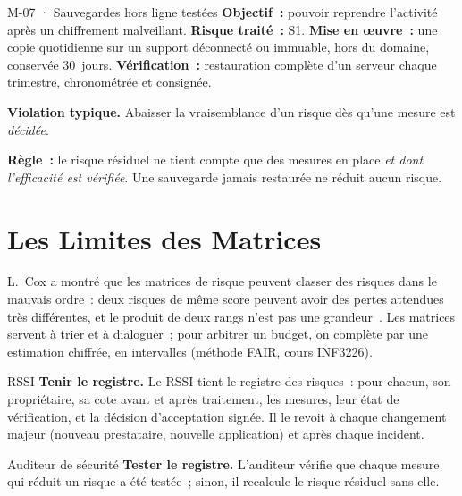 \begin{boxobjet}{M-07 · Sauvegardes hors ligne testées}
\textbf{Objectif~:} pouvoir reprendre l'activité après un chiffrement
malveillant. \textbf{Risque traité~:} S1. \textbf{Mise en œuvre~:} une
copie quotidienne sur un support déconnecté ou immuable, hors du domaine,
conservée 30~jours. \textbf{Vérification~:} restauration complète d'un
serveur chaque trimestre, chronométrée et consignée.
\end{boxobjet}

\begin{boxalert}
\textbf{Violation typique.} Abaisser la vraisemblance d'un risque dès
qu'une mesure est \emph{décidée}.

\smallskip
\textbf{Règle~:} le risque résiduel ne tient compte que des mesures en
place \emph{et dont l'efficacité est vérifiée}. Une sauvegarde jamais
restaurée ne réduit aucun risque.
\end{boxalert}

\section{Les Limites des Matrices}
\label{sec:c07-limites}

L.~Cox a montré que les matrices de risque peuvent classer des risques
dans le mauvais ordre~: deux risques de même score peuvent avoir des
pertes attendues très différentes, et le produit de deux rangs n'est pas
une grandeur~\cite{cox2008matrices}. Les matrices servent à trier et à
dialoguer~; pour arbitrer un budget, on complète par une estimation
chiffrée, en intervalles (méthode FAIR, cours INF3226).

\begin{boxmetier}{RSSI}
\textbf{Tenir le registre.} Le RSSI tient le registre des risques~: pour
chacun, son propriétaire, sa cote avant et après traitement, les mesures,
leur état de vérification, et la décision d'acceptation signée. Il le
revoit à chaque changement majeur (nouveau prestataire, nouvelle
application) et après chaque incident.
\end{boxmetier}

\begin{boxmetier}{Auditeur de sécurité}
\textbf{Tester le registre.} L'auditeur vérifie que chaque mesure qui
réduit un risque a été testée~; sinon, il recalcule le risque résiduel
sans elle.
\end{boxmetier}

